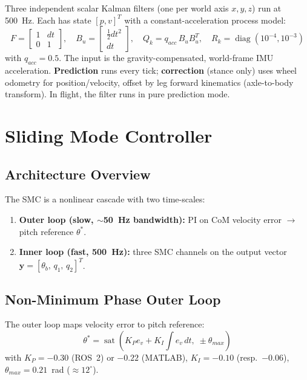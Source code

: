 \documentclass[11pt,a4paper]{article}
\newcommand{\dgr}{^{\circ}}
\begin{document}
Three independent scalar Kalman filters (one per world axis $x,y,z$) run at 500~Hz.  Each
has state $[p,v]^T$ with a constant-acceleration process model:
\begin{equation}
    F = \begin{bmatrix} 1 & dt \\ 0 & 1 \end{bmatrix},\quad
    B_u = \begin{bmatrix} \tfrac{1}{2}dt^2 \\ dt \end{bmatrix},\quad
    Q_k = q_{acc}\,B_u B_u^T,\quad
    R_k = \operatorname{diag}(10^{-4}, 10^{-3})
\end{equation}
with $q_{acc} = 0.5$.  The input is the gravity-compensated, world-frame IMU acceleration.
\textbf{Prediction} runs every tick; \textbf{correction} (stance only) uses wheel odometry
for position/velocity, offset by leg forward kinematics (axle-to-body transform).  In
flight, the filter runs in pure prediction mode.


\section{Sliding Mode Controller}
\label{sec:smc}

\subsection{Architecture Overview}

The SMC is a nonlinear cascade with two time-scales:
\begin{enumerate}
    \item \textbf{Outer loop (slow, $\sim$50~Hz bandwidth):} PI on CoM velocity error
          $\to$ pitch reference $\theta^*$.
    \item \textbf{Inner loop (fast, 500~Hz):} three SMC channels on the output vector
          $\bm{y} = [\theta_b,\,q_1,\,q_2]^T$.
\end{enumerate}

\subsection{Non-Minimum Phase Outer Loop}

The outer loop maps velocity error to pitch reference:
\begin{equation}
    \theta^* = \operatorname{sat}\!\left(K_P e_v + K_I\!\int\!e_v\,dt,\;
    \pm\theta_{max}\right)
\end{equation}
with $K_P = -0.30$ (ROS~2) or $-0.22$ (MATLAB), $K_I = -0.10$ (resp.\ $-0.06$),
$\theta_{max} = 0.21$~rad ($\approx 12\dgr$).
\end{document}
